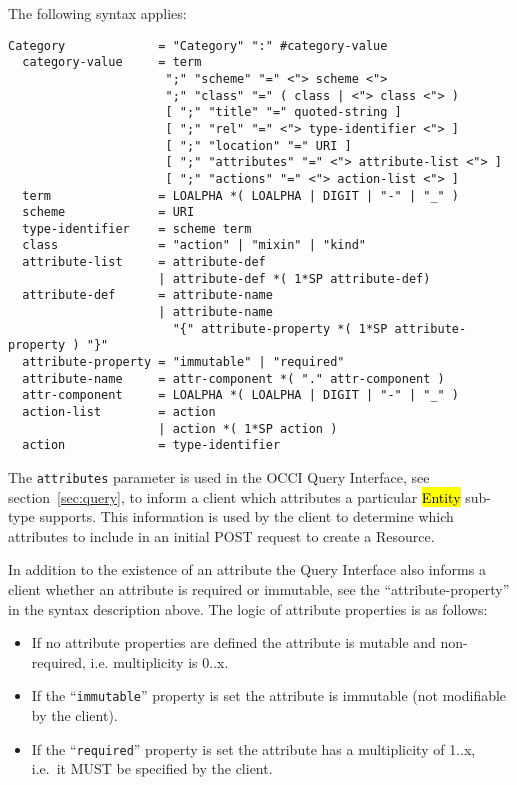 \documentclass[10pt,a4paper]{article}
\begin{document}
The following syntax applies:

\begin{verbatim}
Category             = "Category" ":" #category-value
  category-value     = term
                      ";" "scheme" "=" <"> scheme <">
                      ";" "class" "=" ( class | <"> class <"> )
                      [ ";" "title" "=" quoted-string ]
                      [ ";" "rel" "=" <"> type-identifier <"> ]
                      [ ";" "location" "=" URI ]
                      [ ";" "attributes" "=" <"> attribute-list <"> ]
                      [ ";" "actions" "=" <"> action-list <"> ]
  term               = LOALPHA *( LOALPHA | DIGIT | "-" | "_" )
  scheme             = URI
  type-identifier    = scheme term
  class              = "action" | "mixin" | "kind"
  attribute-list     = attribute-def
                     | attribute-def *( 1*SP attribute-def)
  attribute-def      = attribute-name
                     | attribute-name
                       "{" attribute-property *( 1*SP attribute-property ) "}"
  attribute-property = "immutable" | "required"
  attribute-name     = attr-component *( "." attr-component )
  attr-component     = LOALPHA *( LOALPHA | DIGIT | "-" | "_" )
  action-list        = action
                     | action *( 1*SP action )
  action             = type-identifier
\end{verbatim}

The {\tt attributes} parameter is used in the OCCI Query Interface,
see section~\ref{sec:query}, to inform a client which attributes a
particular \hl{Entity} sub-type supports. This information is used by
the client to determine which attributes to include in an initial POST
request to create a Resource.

In addition to the existence of an attribute the Query Interface also
informs a client whether an attribute is required or immutable, see
the ``attribute-property'' in the syntax description above. The logic
of attribute properties is as follows:

\begin{itemize} 
  \item If no attribute properties are defined the attribute is
    mutable and non-required, i.e. multiplicity is 0..x.
  \item If the ``{\tt immutable}'' property is set the attribute is
    immutable (not modifiable by the client).
  \item If the ``{\tt required}'' property is set the attribute has a
    multiplicity of 1..x, i.e.~it MUST be specified by the client.
\end{itemize}
\end{document}
